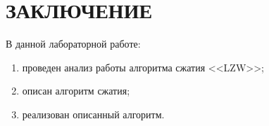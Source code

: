 \chapter*{ЗАКЛЮЧЕНИЕ}

В данной лабораторной работе:

\begin{enumerate}[label=---]
    \item проведен анализ работы алгоритма сжатия <<LZW>>;
    \item описан алгоритм сжатия;
    \item реализован описанный алгоритм.
\end{enumerate}
